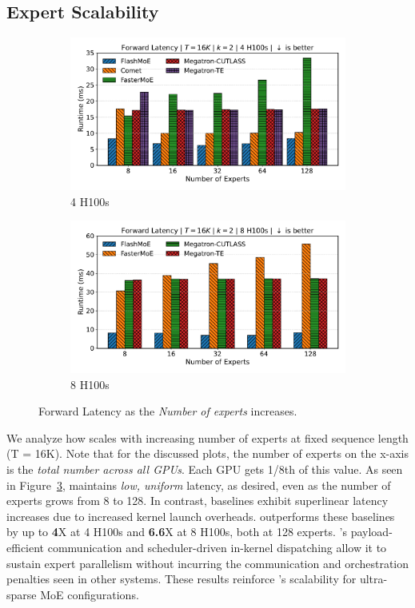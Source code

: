 \subsection{Expert Scalability}\label{subsec:expert-scalability}
\begin{figure}[!h]
    \centering
    \begin{subfigure}{0.49\textwidth}
        \centering
        \includegraphics[width=\linewidth, keepaspectratio]{flash_figs/scaling_experts}
        \caption{4 H100s}
        \label{sub:4gx}
    \end{subfigure}
    \begin{subfigure}{0.49\textwidth}
        \centering
        \includegraphics[width=\linewidth, keepaspectratio]{flash_figs/scaling_experts_8}
        \caption{8 H100s}
        \label{sub:8gx}
    \end{subfigure}
    \caption{Forward Latency as the \emph{Number of experts} increases.}
    \label{fig:xs}
\end{figure}
We analyze how \sysname scales with increasing number of experts at fixed sequence length (T = 16K).
Note that for the discussed plots, the number of experts on the x-axis is the \emph{total number across all GPUs}.
Each GPU gets 1/8th of this value.
As seen in Figure~\ref{fig:xs}, \sysname maintains \emph{low, uniform} latency, as desired,
even as the number of experts grows from 8 to 128.
In contrast, baselines exhibit superlinear latency increases due to increased kernel launch overheads.
\sysname outperforms these baselines by up to \textbf{4}X at 4 H100s and \textbf{6.6}X at 8 H100s, both at 128 experts.
\sysname’s payload-efficient communication and scheduler-driven
in-kernel dispatching allow it to sustain expert parallelism
without incurring the communication and orchestration penalties seen in other systems.
These results reinforce \sysname’s scalability for ultra-sparse MoE configurations.
